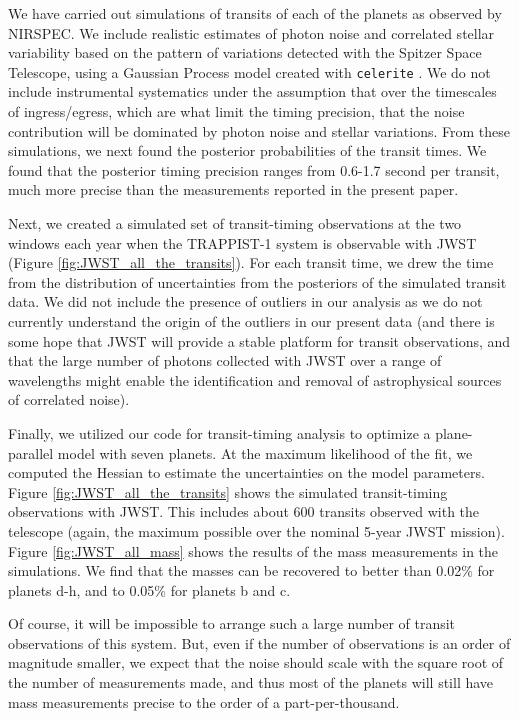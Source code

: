 \documentclass[twocolumn]{aastex63}
\begin{document}
We have carried out simulations of transits of each of the planets as observed by NIRSPEC.  We include realistic estimates of photon noise and correlated stellar variability based on the pattern of variations detected with the Spitzer Space Telescope, using a Gaussian Process model created with \texttt{celerite} \citep{ForemanMackey2017}.  We do not include instrumental systematics under the assumption that over the timescales of ingress/egress, which are what limit the timing precision, that the noise contribution will be dominated by photon noise and stellar variations.
From these simulations, we
next found the posterior probabilities of the transit times.   We found that the posterior timing precision ranges from 0.6-1.7 second per transit, much more precise than the measurements reported in the present paper.

Next, we created a simulated set of transit-timing observations at the two windows each year when the TRAPPIST-1 system is observable with JWST (Figure \ref{fig:JWST_all_the_transits}).   For each transit time, we drew the time from the distribution of uncertainties from the posteriors of the simulated transit data.  We did not include the presence of outliers in our analysis as we do not currently understand the origin of the outliers in our present data (and there is some hope that JWST will provide a stable platform for transit observations, and that the large number of photons collected with JWST over a range of wavelengths might enable the identification and removal of astrophysical sources of correlated noise).

Finally, we utilized our code for transit-timing analysis  to optimize a plane-parallel model with seven planets.  At the maximum likelihood of the fit, we computed the Hessian to estimate the uncertainties on the model parameters.  Figure \ref{fig:JWST_all_the_transits} shows the simulated transit-timing observations with JWST.   This includes about 600 transits observed with the telescope (again, the maximum possible over the nominal 5-year JWST mission).  Figure \ref{fig:JWST_all_mass} shows the results of the mass measurements in the simulations.  We find that the masses can be recovered to better than 0.02\% for planets d-h, and to 0.05\% for planets b and c.

Of course, it will be impossible to arrange such a large number of transit observations of this system.  But, even if the number of observations is an order of magnitude smaller, we expect that the noise should scale with the square root of the number of measurements made, and thus most of the planets will still have mass measurements precise to the order of a part-per-thousand.
\end{document}
